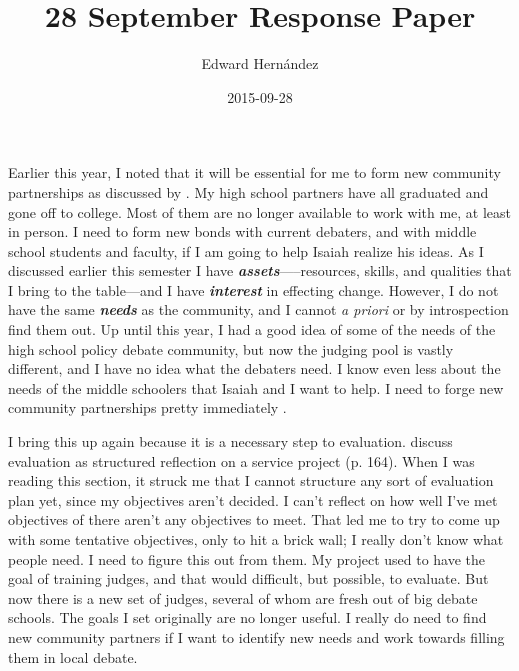 \documentclass[man,12pt]{apa6}
\begin{document}
\title{28 September Response Paper}
\author{Edward Hern\'{a}ndez}
\date{2015-09-28}
\maketitle

Earlier this year, I noted that it will be essential for me to form new
community partnerships as discussed by . 
My high school partners have all graduated and gone off to college. Most of
them are no longer available to work with me, at least in person.  I need to
form new bonds with current debaters, and with middle school students and
faculty, if I am going to help Isaiah realize his ideas. As I discussed earlier
this semester I have \textit{\textbf{assets}}—--resources, skills, and
qualities that I bring to the table—and I have \textit{\textbf{interest}} in
effecting change. However, I do not have the same \textit{\textbf{needs}} as
the community, and I cannot \emph{a priori} or by introspection find them out.
Up until this year, I had a good idea of some of the needs of the high school
policy debate community, but now the judging pool is vastly different, and I
have no idea what the debaters need. 
I know even less about the needs of the middle schoolers that Isaiah and I want
to help. I need to forge new community partnerships pretty immediately
\cite{Cress13}.

I bring this up again because it is a necessary step to evaluation.
 discuss evaluation as structured reflection on a service
project (p. 164). When I was reading this section, it struck me that I cannot
structure any sort of evaluation plan yet, since my objectives aren't decided.
I can't reflect on how well I've met objectives of there aren't any objectives
to meet. That led me to try to come up with some tentative objectives, only to
hit a brick wall; I really don't know what people need. 
I need to figure this out from them. My project used to have the goal of
training judges, and that would difficult, but possible, to evaluate.  But now
there is a new set of judges, several of whom are fresh out of big debate
schools. The goals I set originally are no longer useful. I really do need to
find new community partners if I want to identify new needs and work towards
filling them in local debate.
\end{document}

